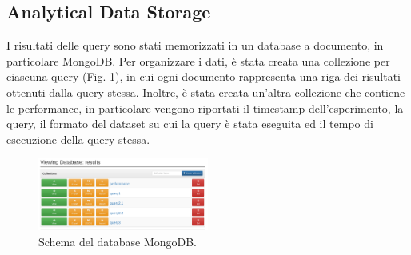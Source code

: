 \documentclass[conference]{IEEEtran}
\begin{document}
\subsection{Analytical Data Storage}
I risultati delle query sono stati memorizzati in un database a documento, in particolare MongoDB.
Per organizzare i dati, è stata creata una collezione per ciascuna query (Fig. \ref{fig:mongo}), in cui ogni documento rappresenta una riga dei risultati ottenuti dalla query stessa. Inoltre, è stata creata un'altra collezione che contiene le performance, in particolare vengono riportati il timestamp dell'esperimento, la query, il formato del dataset su cui la query è stata eseguita ed il tempo di esecuzione della query stessa.
\begin{figure}[H]
    \centerline{\includegraphics[width=0.5\textwidth]{res/mongo.png}}
    \caption{Schema del database MongoDB.}
    \label{fig:mongo}
\end{figure}
\end{document}
